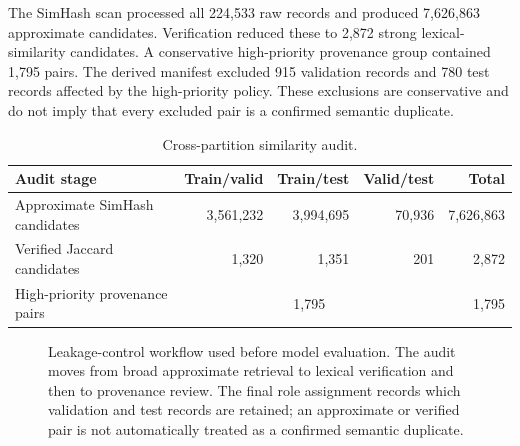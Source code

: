 \documentclass[pdflatex,sn-mathphys-num]{sn-jnl}
\begin{document}
The SimHash scan processed all 224,533 raw records and produced 7,626,863 approximate candidates. Verification reduced these to 2,872 strong lexical-similarity candidates. A conservative high-priority provenance group contained 1,795 pairs. The derived manifest excluded 915 validation records and 780 test records affected by the high-priority policy. These exclusions are conservative and do not imply that every excluded pair is a confirmed semantic duplicate.

\begin{table}[htbp]
\caption{Cross-partition similarity audit.}\label{tab:leakage}
\centering
\begin{tabular}{@{}lrrrr@{}}
\toprule
Audit stage & Train/valid & Train/test & Valid/test & Total\\
\midrule
Approximate SimHash candidates & 3,561,232 & 3,994,695 & 70,936 & 7,626,863\\
Verified Jaccard candidates & 1,320 & 1,351 & 201 & 2,872\\
High-priority provenance pairs & \multicolumn{3}{c}{1,795} & 1,795\\
\bottomrule
\end{tabular}
\end{table}

\begin{figure}[htbp]
\centering
{}
\caption{Leakage-control workflow used before model evaluation. The audit moves from broad approximate retrieval to lexical verification and then to provenance review. The final role assignment records which validation and test records are retained; an approximate or verified pair is not automatically treated as a confirmed semantic duplicate.}
\label{fig:leakage-flow}
\end{figure}
\end{document}
